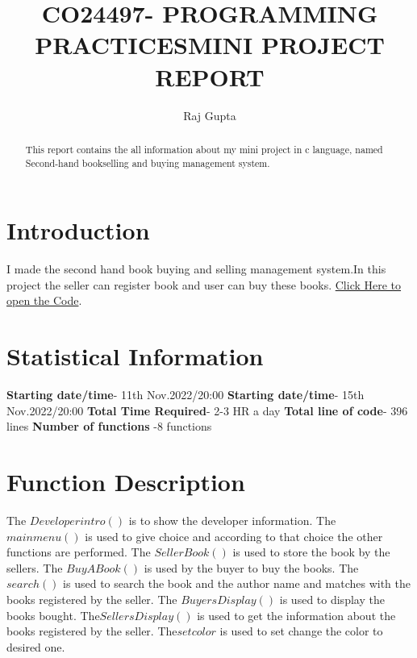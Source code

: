 \documentclass[12pt]{article}
\title{CO24497- PROGRAMMING PRACTICES}
\title{MINI PROJECT REPORT}
\author{Raj Gupta}
\begin{document}
\maketitle
\begin{abstract}
\normalsize
This report contains the all information about my mini project in c language, named Second-hand bookselling and buying management system.
\end{abstract}
\tableofcontents
\clearpage


\section{Introduction}
I made the second hand book buying and selling management system.In this project the seller can register book and user can buy these books. 
\href{https://www.overleaf.com/user/subscription/plans}{Click Here to open the Code}.

\section{Statistical Information}
 \textbf{Starting date/time}- 11th Nov.2022/20:00\newline
\textbf{Starting date/time}- 15th Nov.2022/20:00\newline
\textbf{Total Time Required}- 2-3 HR a day\newline
\textbf{Total line of code}- 396 lines\newline
\textbf{Number of functions} -8 functions\newline


\section{Function Description}
The \textbf{$Developerintro()$} is to show the  developer information.\newline
The \textbf{$mainmenu()$} is used to give choice and according to that choice the other functions are performed.\newline
The \textbf{$SellerBook()$} is used to store the book by the sellers.\newline
The \textbf{$BuyABook()$} is used by the buyer to buy the books.\newline
The \textbf{$search()$} is used to search the book and the author name and matches with the books registered by the seller.\newline
The \textbf{$BuyersDisplay()$} is used to display the books bought.\newline
The\textbf{$SellersDisplay()$} is used to get the information about the books registered by the seller.\newline
The\textbf{$setcolor$} is used to set change the color to desired one.\newline
\clearpage
\end{document}
